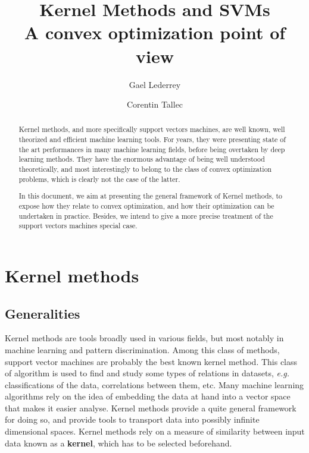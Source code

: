 \documentclass[a4paper, 11pt]{article}
\title{{\bf Kernel Methods and SVMs} \\
{\large A convex optimization point of view}}
\author{Gael Lederrey\\
  \and
Corentin Tallec}
\begin{document}
\maketitle
\begin{abstract}
Kernel methods, and more specifically support vectors machines, are
  well known, well theorized and efficient machine learning tools. For
  years, they were presenting state of the art performances in many
  machine learning fields, before being overtaken by deep learning
  methods. They have the enormous advantage of being well understood
  theoretically, and most interestingly to belong to the class of
  convex optimization problems, which is clearly not the case of the
  latter.

  In this document, we aim at presenting the general framework of
  Kernel methods, to expose how they relate to convex optimization,
  and how their optimization can be undertaken in practice. Besides,
  we intend to give a more precise treatment of the support vectors
  machines special case.
\end{abstract}

\section{Kernel methods\footnotemark}
\subsection{Generalities}
\label{sub:gen}


Kernel methods are tools broadly used in various fields, but most notably in
machine learning and pattern discrimination. Among this class of methods,
support vector machines are probably the best known kernel method. This class
of algorithm is used to find and study some types of relations in datasets,
{\it e.g.} classifications of the data, correlations between them, etc. Many
machine learning algorithms rely on the idea of embedding the data at hand
into a vector space that makes it easier analyse. Kernel methods provide
a quite general framework for doing so, and provide tools to transport data
into possibly infinite dimensional spaces. Kernel methods rely on a measure
of similarity between input data known as a {\bf kernel}, which has to be selected
beforehand.
\end{document}
